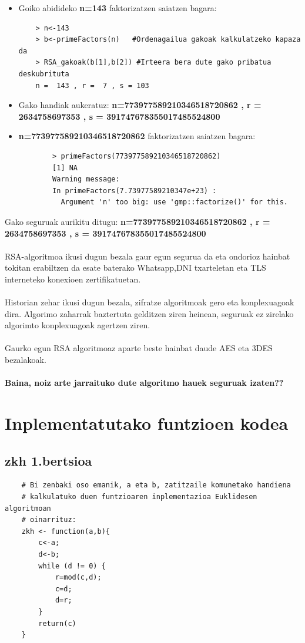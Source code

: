 \documentclass[12pt]{basque-book}
\begin{document}
\begin{itemize}
    \item Goiko abidideko \textbf{n=143} faktorizatzen saiatzen bagara:
    \begin{verbatim}
    > n<-143
    > b<-primeFactors(n)   #Ordenagailua gakoak kalkulatzeko kapaza da
    > RSA_gakoak(b[1],b[2]) #Irteera bera dute gako pribatua deskubrituta
    n =  143 , r =  7 , s = 103
    \end{verbatim}
    \newpage
    \item Gako handiak aukeratuz: \textbf{n=773977589210346518720862 , r =  2634758697353 , s = 391747678355017485524800}
    \item\textbf{n=773977589210346518720862} faktorizatzen saiatzen bagara:
    \begin{verbatim}
        > primeFactors(773977589210346518720862)
        [1] NA
        Warning message:
        In primeFactors(7.73977589210347e+23) :
          Argument 'n' too big: use 'gmp::factorize()' for this.
    \end{verbatim}
\end{itemize}
Gako seguruak aurikitu ditugu:\newline
\textbf{n=773977589210346518720862 , r =  2634758697353\newline
, s = 391747678355017485524800}
\\\\
RSA-algoritmoa ikusi dugun bezala gaur egun segurua da eta ondorioz hainbat tokitan erabiltzen da esate baterako Whatsapp,DNI txarteletan eta TLS interneteko konexioen zertifikatuetan.
\\\\
Historian zehar ikusi dugun bezala, zifratze algoritmoak gero eta konplexuagoak dira. Algorimo zaharrak baztertuta gelditzen ziren heinean, seguruak ez zirelako algorimto konplexuagoak agertzen ziren.
\\\\
Gaurko egun RSA algoritmoaz aparte beste hainbat daude AES eta 3DES bezalakoak.
\\\\
\textbf{Baina, noiz arte jarraituko dute algoritmo hauek seguruak izaten??}


\chapter{Inplementatutako funtzioen kodea}
\section{zkh 1.bertsioa}
\begin{verbatim}
    # Bi zenbaki oso emanik, a eta b, zatitzaile komunetako handiena 
    # kalkulatuko duen funtzioaren inplementazioa Euklidesen algoritmoan
    # oinarrituz:
    zkh <- function(a,b){ 
        c<-a;
        d<-b;
        while (d != 0) {
            r=mod(c,d);
            c=d;
            d=r;
        }
        return(c)  
    }
\end{verbatim}
\end{document}
